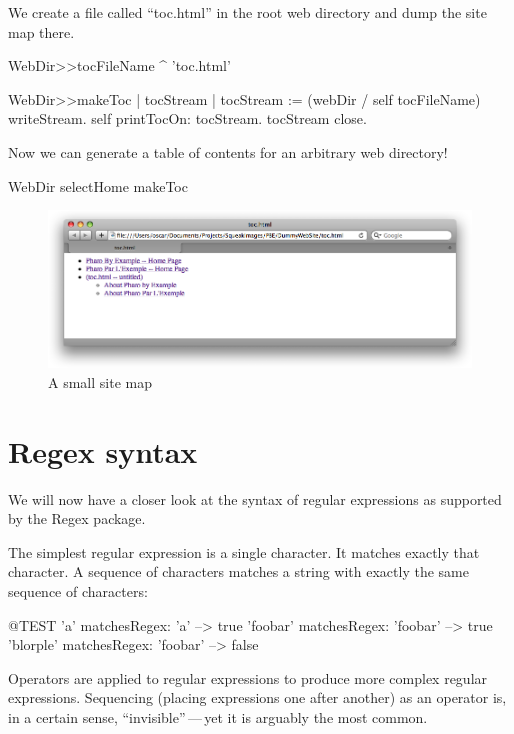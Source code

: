 \documentclass[a4paper,10pt,twoside]{book}
\begin{document}
We create a file called ``toc.html'' in the root web directory and dump the site map there.
\begin{code}{}
WebDir>>tocFileName
	^ 'toc.html'

WebDir>>makeToc
	| tocStream |
	tocStream :=  (webDir / self tocFileName) writeStream.
	self printTocOn: tocStream.
	tocStream close.
\end{code}

Now we can generate a table of contents for an arbitrary web directory!
\begin{code}{}
WebDir selectHome makeToc
\end{code}

\begin{figure}[tbh]
\begin{center}
\includegraphics[width=\textwidth]{PBE-toc}
\caption{A small site map}
\end{center}
\end{figure}

\section{Regex syntax}

We will now have a closer look at the syntax of regular expressions as supported by the Regex package.

The simplest regular expression is a single character.  It matches exactly that character. A sequence of characters matches a string with exactly the same sequence of characters:
\begin{code}{@TEST}
'a' matchesRegex: 'a'                  --> true
'foobar' matchesRegex: 'foobar'  --> true
'blorple' matchesRegex: 'foobar' --> false
\end{code}

Operators are applied to regular expressions to
produce more complex regular expressions. Sequencing (placing expressions one
after another) as an operator is, in a certain sense, ``invisible''\,---\,yet it is
arguably the most common.
\end{document}
